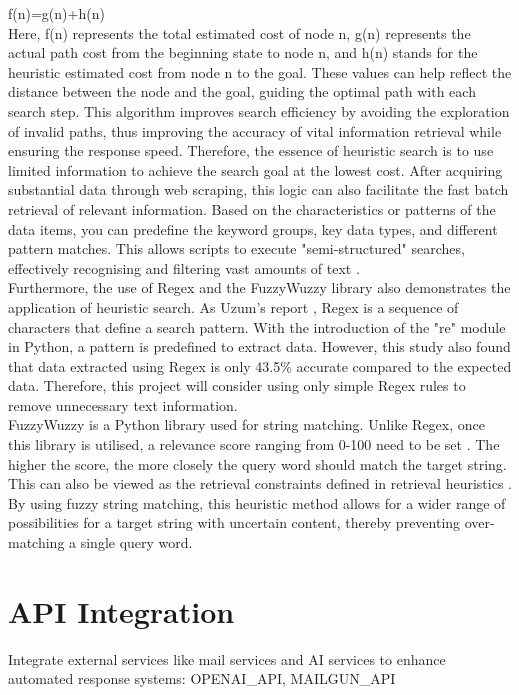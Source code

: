 \documentclass[ oneside,%
                    author={Cassie Qing Tang},
                    degree={BSc},
                     title={An Automated Response System for Disrupting Online Pet Scamming \\ },
                    subtitle={ }]{dissertation}
\begin{document}
f(n)=g(n)+h(n)
\\

Here, f(n) represents the total estimated cost of node n, g(n) represents the actual path cost from the beginning state to node n, and h(n) stands for the heuristic estimated cost from node n to the goal. These values can help reflect the distance between the node and the goal, guiding the optimal path with each search step. This algorithm improves search efficiency by avoiding the exploration of invalid paths, thus improving the accuracy of vital information retrieval while ensuring the response speed. Therefore, the essence of heuristic search is to use limited information to achieve the search goal at the lowest cost. After acquiring substantial data through web scraping, this logic can also facilitate the fast batch retrieval of relevant information. Based on the characteristics or patterns of the data items, you can predefine the keyword groups, key data types, and different pattern matches. This allows scripts to execute "semi-structured" searches, effectively recognising and filtering vast amounts of text \cite{manning_introduction_2009}.
\\

Furthermore, the use of Regex and the FuzzyWuzzy library also demonstrates the application of heuristic search. As Uzum's report \cite{uzun_comparison_2018}, Regex is a sequence of characters that define a search pattern. With the introduction of the "re" module in Python, a pattern is predefined to extract data. However, this study also found that data extracted using Regex is only 43.5\% accurate compared to the expected data. Therefore, this project will consider using only simple Regex rules to remove unnecessary text information. 
\\

FuzzyWuzzy is a Python library used for string matching. Unlike Regex, once this library is utilised, a relevance score ranging from 0-100 need to be set \cite{majumder_fuzzywuzzy_2021}. The higher the score, the more closely the query word should match the target string. This can also be viewed as the retrieval constraints defined in retrieval heuristics \cite{yang_secure_2021}. By using fuzzy string matching, this heuristic method allows for a wider range of possibilities for a target string with uncertain content, thereby preventing over-matching a single query word.


\section{API Integration}
Integrate external services like mail services and AI services to enhance automated response systems: OPENAI\_API, MAILGUN\_API
\end{document}
